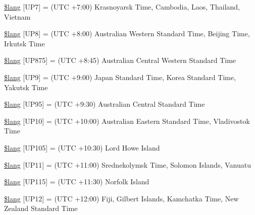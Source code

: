 \begin{DoxyCompactItemize}
\item 
\mbox{\hyperlink{date__lang_8php_a799732511cb304bbc912cd2931310624}{\$lang}} \mbox{[}\textquotesingle{}U\+P7\textquotesingle{}\mbox{]} = \textquotesingle{}(U\+TC +7\+:00) Krasnoyarsk Time, Cambodia, Laos, Thailand, Vietnam\textquotesingle{}
\item 
\mbox{\hyperlink{date__lang_8php_acf285ccb0e9fe588e2b6ff4b956c00f3}{\$lang}} \mbox{[}\textquotesingle{}U\+P8\textquotesingle{}\mbox{]} = \textquotesingle{}(U\+TC +8\+:00) Australian Western Standard Time, Beijing Time, Irkutsk Time\textquotesingle{}
\item 
\mbox{\hyperlink{date__lang_8php_ad7cd66fa1f2c05bc37e5efe474398fc0}{\$lang}} \mbox{[}\textquotesingle{}U\+P875\textquotesingle{}\mbox{]} = \textquotesingle{}(U\+TC +8\+:45) Australian Central Western Standard Time\textquotesingle{}
\item 
\mbox{\hyperlink{date__lang_8php_a8f4b6ef7f33951463505863c088683bc}{\$lang}} \mbox{[}\textquotesingle{}U\+P9\textquotesingle{}\mbox{]} = \textquotesingle{}(U\+TC +9\+:00) Japan Standard Time, Korea Standard Time, Yakutsk Time\textquotesingle{}
\item 
\mbox{\hyperlink{date__lang_8php_ae2bbb12623aa152f19b174499c3981fc}{\$lang}} \mbox{[}\textquotesingle{}U\+P95\textquotesingle{}\mbox{]} = \textquotesingle{}(U\+TC +9\+:30) Australian Central Standard Time\textquotesingle{}
\item 
\mbox{\hyperlink{date__lang_8php_accbfa4eb6a14112e43380e29687911f1}{\$lang}} \mbox{[}\textquotesingle{}U\+P10\textquotesingle{}\mbox{]} = \textquotesingle{}(U\+TC +10\+:00) Australian Eastern Standard Time, Vladivostok Time\textquotesingle{}
\item 
\mbox{\hyperlink{date__lang_8php_af8992c0f13db4171052e552a6b645dbf}{\$lang}} \mbox{[}\textquotesingle{}U\+P105\textquotesingle{}\mbox{]} = \textquotesingle{}(U\+TC +10\+:30) Lord Howe Island\textquotesingle{}
\item 
\mbox{\hyperlink{date__lang_8php_a41eae482c6d807d62b7b89ba1c926410}{\$lang}} \mbox{[}\textquotesingle{}U\+P11\textquotesingle{}\mbox{]} = \textquotesingle{}(U\+TC +11\+:00) Srednekolymsk Time, Solomon Islands, Vanuatu\textquotesingle{}
\item 
\mbox{\hyperlink{date__lang_8php_a7efc03895acaf0d826fc1067ed3a130a}{\$lang}} \mbox{[}\textquotesingle{}U\+P115\textquotesingle{}\mbox{]} = \textquotesingle{}(U\+TC +11\+:30) Norfolk Island\textquotesingle{}
\item 
\mbox{\hyperlink{date__lang_8php_abcc3ae08d57820d5fcaa69d9406b726e}{\$lang}} \mbox{[}\textquotesingle{}U\+P12\textquotesingle{}\mbox{]} = \textquotesingle{}(U\+TC +12\+:00) Fiji, Gilbert Islands, Kamchatka Time, New Zealand Standard Time\textquotesingle{}

\end{DoxyCompactItemize}
